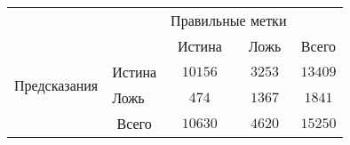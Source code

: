 \begin{tabular}{l|l|c|c|c}
\multicolumn{2}{c}{}&\multicolumn{2}{c}{Правильные метки}&\\
\cline{3-4}
\multicolumn{2}{c|}{}&Истина&Ложь&\multicolumn{1}{c}{Всего}\\
\cline{2-4}
\multirow{2}{*}{Предсказания }& Истина & $ 10156 $ & $ 3253 $ & $ 13409$\\
\cline{2-4}
& Ложь & $474$ & $1367$ & $ 1841 $\\
\cline{2-4}
\multicolumn{1}{c}{} & \multicolumn{1}{c}{Всего} & \multicolumn{1}{c}{$10630$} & \multicolumn{1}{c}{$4620$} & \multicolumn{1}{c}{$15250$}\\
\end{tabular}